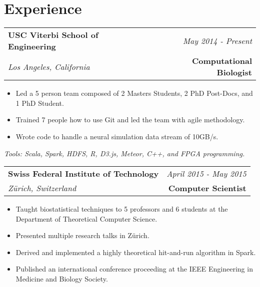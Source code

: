 \documentclass[10pt,a4paper]{article}
\begin{document}
    \vspace*{3mm}\section*{Experience}
  \noindent\begin{tabularx}{17cm}{X r}
    \textbf{USC Viterbi School of Engineering} & \textit{May 2014 - Present} \\
    \textit{Los Angeles, California} & \textbf{Computational Biologist} \\
  \end{tabularx}

  \vspace*{1mm}\noindent\begin{minipage}{17cm}
    \begin{itemize}[leftmargin=6mm,topsep=0mm,itemsep=-1mm]
      \item Led a 5 person team composed of 2 Masters Students, 2 PhD Post-Docs, and 1 PhD Student.
      \item Trained 7 people how to use Git and led the team with agile methodology.
      \item Wrote code to handle a neural simulation data stream of 10GB/s.
    \end{itemize}
  \end{minipage}

  \vspace*{2mm}\setlength\parindent{2mm}\begin{minipage}{16.8cm}
    \textit{Tools: Scala, Spark, HDFS, R, D3.js, Meteor, C++, and FPGA programming.}
  \end{minipage}

  \vspace*{3mm}\noindent\begin{tabularx}{17cm}{X r}
    \textbf{Swiss Federal Institute of Technology} & \textit{April 2015 - May 2015} \\
    \textit{Z{\"u}rich, Switzerland} & \textbf{Computer Scientist} \\
  \end{tabularx}

  \vspace*{1mm}\noindent\begin{minipage}{17cm}
    \begin{itemize}[leftmargin=6mm,topsep=0mm,itemsep=-1mm]
      \item Taught biostatistical techniques to 5 professors and 6 students at the Department of Theoretical Computer Science. 
      \item Presented multiple research talks in Z{\"u}rich.
      \item Derived and implemented a highly theoretical hit-and-run algorithm in Spark.
      \item Published an international conference proceeding at the IEEE Engineering in Medicine and Biology Society.
    \end{itemize}
  \end{minipage}
\end{document}
